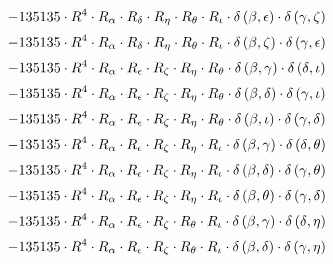 \begin{subequations}
\begin{gather}
 \\[0.2em] \notag 		 - 135135 \cdot R^{4} \cdot R_{\alpha{}} \cdot R_{\delta{}} \cdot R_{\eta{}} \cdot R_{\theta{}} \cdot R_{\iota{}} \cdot \delta{}\left(\beta{}, \epsilon{}\right) \cdot \delta{}\left(\gamma{}, \zeta{}\right) 
 \\[0.2em] \notag 		 - 135135 \cdot R^{4} \cdot R_{\alpha{}} \cdot R_{\delta{}} \cdot R_{\eta{}} \cdot R_{\theta{}} \cdot R_{\iota{}} \cdot \delta{}\left(\beta{}, \zeta{}\right) \cdot \delta{}\left(\gamma{}, \epsilon{}\right) 
 \\[0.2em] \notag 		 - 135135 \cdot R^{4} \cdot R_{\alpha{}} \cdot R_{\epsilon{}} \cdot R_{\zeta{}} \cdot R_{\eta{}} \cdot R_{\theta{}} \cdot \delta{}\left(\beta{}, \gamma{}\right) \cdot \delta{}\left(\delta{}, \iota{}\right) 
 \\[0.2em] \notag 		 - 135135 \cdot R^{4} \cdot R_{\alpha{}} \cdot R_{\epsilon{}} \cdot R_{\zeta{}} \cdot R_{\eta{}} \cdot R_{\theta{}} \cdot \delta{}\left(\beta{}, \delta{}\right) \cdot \delta{}\left(\gamma{}, \iota{}\right) 
 \\[0.2em] \notag 		 - 135135 \cdot R^{4} \cdot R_{\alpha{}} \cdot R_{\epsilon{}} \cdot R_{\zeta{}} \cdot R_{\eta{}} \cdot R_{\theta{}} \cdot \delta{}\left(\beta{}, \iota{}\right) \cdot \delta{}\left(\gamma{}, \delta{}\right) 
 \\[0.2em] \notag 		 - 135135 \cdot R^{4} \cdot R_{\alpha{}} \cdot R_{\epsilon{}} \cdot R_{\zeta{}} \cdot R_{\eta{}} \cdot R_{\iota{}} \cdot \delta{}\left(\beta{}, \gamma{}\right) \cdot \delta{}\left(\delta{}, \theta{}\right) 
 \\[0.2em] \notag 		 - 135135 \cdot R^{4} \cdot R_{\alpha{}} \cdot R_{\epsilon{}} \cdot R_{\zeta{}} \cdot R_{\eta{}} \cdot R_{\iota{}} \cdot \delta{}\left(\beta{}, \delta{}\right) \cdot \delta{}\left(\gamma{}, \theta{}\right) 
 \\[0.2em] \notag 		 - 135135 \cdot R^{4} \cdot R_{\alpha{}} \cdot R_{\epsilon{}} \cdot R_{\zeta{}} \cdot R_{\eta{}} \cdot R_{\iota{}} \cdot \delta{}\left(\beta{}, \theta{}\right) \cdot \delta{}\left(\gamma{}, \delta{}\right) 
 \\[0.2em] \notag 		 - 135135 \cdot R^{4} \cdot R_{\alpha{}} \cdot R_{\epsilon{}} \cdot R_{\zeta{}} \cdot R_{\theta{}} \cdot R_{\iota{}} \cdot \delta{}\left(\beta{}, \gamma{}\right) \cdot \delta{}\left(\delta{}, \eta{}\right) 
 \\[0.2em] \notag 		 - 135135 \cdot R^{4} \cdot R_{\alpha{}} \cdot R_{\epsilon{}} \cdot R_{\zeta{}} \cdot R_{\theta{}} \cdot R_{\iota{}} \cdot \delta{}\left(\beta{}, \delta{}\right) \cdot \delta{}\left(\gamma{}, \eta{}\right) 

\end{gather}
\end{subequations}
